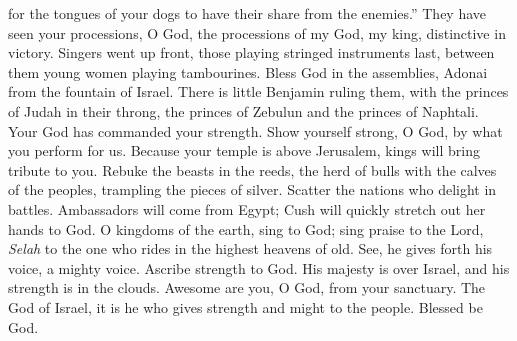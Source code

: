 \begin{biblechapter}
for the tongues of your dogs to have their share from the enemies.”
\verse They have seen your processions, O God, 
the processions of my God, my king, distinctive in victory.
\verse Singers went up front, those playing stringed instruments last, 
between them young women playing tambourines.
\verse Bless God in the assemblies, 
Adonai from the fountain of Israel.
\verse There is little Benjamin ruling them, 
with the princes of Judah in their throng, 
the princes of Zebulun and the princes of Naphtali.
\verse Your God has commanded your strength. 
Show yourself strong, O God, by what you perform for us.
\verse Because your temple is above Jerusalem, 
kings will bring tribute to you.
\verse Rebuke the beasts in the reeds, 
the herd of bulls with the calves of the peoples, 
trampling the pieces of silver. 
Scatter the nations who delight in battles.
\verse Ambassadors will come from Egypt; 
Cush will quickly stretch out her hands to God.
\verse O kingdoms of the earth, sing to God; 
sing praise to the Lord, \textit{Selah}
\verse to the one who rides in the highest heavens of old. 
See, he gives forth his voice, a mighty voice.
\verse Ascribe strength to God. 
His majesty is over Israel, 
and his strength is in the clouds.
\verse Awesome are you, O God, from your sanctuary. 
The God of Israel, it is he who gives strength and might to the people. 
Blessed be God.
\end{biblechapter}

